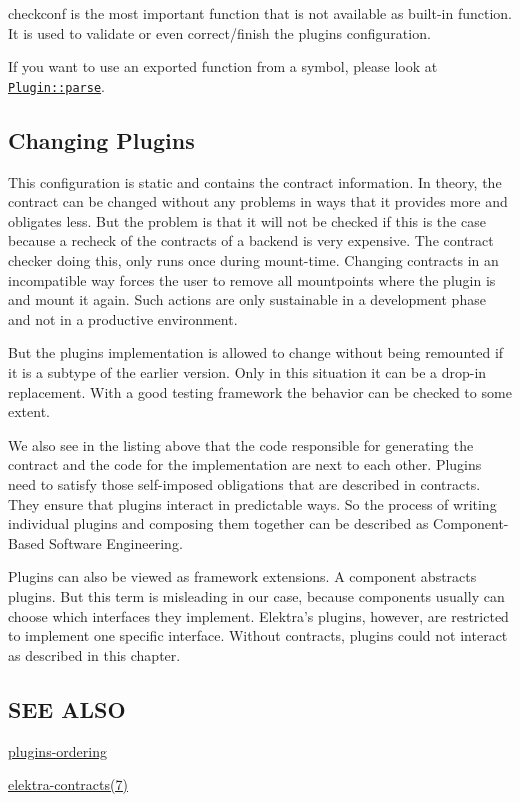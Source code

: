 {\ttfamily checkconf} is the most important function that is not available as built-\/in function. It is used to validate or even correct/finish the plugin\textquotesingle{}s configuration.

If you want to use an exported function from a symbol, please look at \href{/home/markus/Projekte/Elektra/current/src/libs/tools/src/plugin.cpp}{\tt Plugin\+::parse}.

\subsection*{Changing Plugins}

This configuration is static and contains the contract information. In theory, the contract can be changed without any problems in ways that it provides more and obligates less. But the problem is that it will not be checked if this is the case because a recheck of the contracts of a backend is very expensive. The contract checker doing this, only runs once during mount-\/time. Changing contracts in an incompatible way forces the user to remove all mountpoints where the plugin is and mount it again. Such actions are only sustainable in a development phase and not in a productive environment.

But the plugin\textquotesingle{}s implementation is allowed to change without being remounted if it is a subtype of the earlier version. Only in this situation it can be a drop-\/in replacement. With a good testing framework the behavior can be checked to some extent.

We also see in the listing above that the code responsible for generating the contract and the code for the implementation are next to each other. Plugins need to satisfy those self-\/imposed obligations that are described in contracts. They ensure that plugins interact in predictable ways. So the process of writing individual plugins and composing them together can be described as Component-\/\+Based Software Engineering.

Plugins can also be viewed as framework extensions. A component abstracts plugins. But this term is misleading in our case, because components usually can choose which interfaces they implement. Elektra’s plugins, however, are restricted to implement one specific interface. Without contracts, plugins could not interact as described in this chapter.

\subsection*{S\+EE A\+L\+SO}


\begin{DoxyItemize}
\item \hyperlink{doc_dev_plugins-ordering_md}{plugins-\/ordering}
\item \hyperlink{md_doc_help_elektra-contracts_doc_help_elektra-contracts_md}{elektra-\/contracts(7)} 
\end{DoxyItemize}